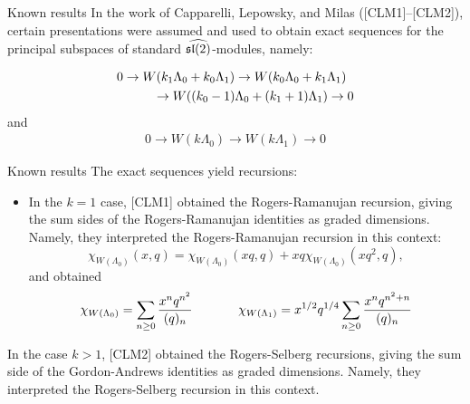 \documentclass{beamer}
\begin{document}
\begin{frame}{Known results}
In the work of Capparelli, Lepowsky, and Milas ([CLM1]--[CLM2]), certain presentations were assumed and used to obtain exact sequences for the principal subspaces of standard $\widehat{\frak{sl}(2)}$-modules, namely:

\begin{eqnarray*}
\lefteqn{0 \rightarrow W(k_1\Lambda_0 + k_0\Lambda_1) \rightarrow W(k_0\Lambda_0 + k_1\Lambda_1)}\\
&& \hspace{0.3in}\rightarrow W((k_0-1)\Lambda_0 + (k_1+1)\Lambda_1) \rightarrow 0
\end{eqnarray*}
and
\begin{eqnarray*}
0 \rightarrow W(k\Lambda_0) \rightarrow W(k\Lambda_1) \rightarrow 0
\end{eqnarray*}

\end{frame}
\begin{frame}{Known results}
The exact sequences yield recursions:
\begin{itemize}
\item In the $k=1$ case, [CLM1] obtained the Rogers-Ramanujan recursion, giving the sum sides of the Rogers-Ramanujan identities as graded dimensions.
Namely, they interpreted the Rogers-Ramanujan recursion in this context:
$$
\chi_{W(\Lambda_0)}(x,q) = \chi_{W(\Lambda_0)}(xq,q) + xq\chi_{W(\Lambda_0)}(xq^2,q),
$$
and obtained
$$
\chi_{W(\Lambda_0)} = \sum_{n \ge 0} \frac{x^n q^{n^2}}{(q)_n} \hspace{0.5in}
\chi_{W(\Lambda_1)} = x^{1/2}q^{1/4}\sum_{n \ge 0} \frac{x^n q^{n^2+n}}{(q)_n}
$$
\end{itemize}
In the case $k>1$, [CLM2] obtained the Rogers-Selberg recursions, giving the sum side of the Gordon-Andrews identities as graded dimensions.
Namely, they interpreted the Rogers-Selberg recursion in this context.
\end{frame}
\end{document}
